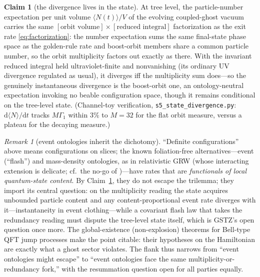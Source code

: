 \documentclass[11pt]{article}
\theoremstyle{definition}
\newtheorem{claim}[theorem]{Claim}
\theoremstyle{remark}
\newtheorem{remark}[theorem]{Remark}
\newcommand{\dd}{\mathrm{d}}
\newcommand{\avg}[1]{\langle #1 \rangle}
\begin{document}
\begin{claim}[the divergence lives in the state]
\label{claim:state}
At tree level, the particle-number expectation per unit volume $\avg{N(t)}/V$ of the
evolving coupled-ghost vacuum carries the same
$[\text{orbit volume}]\times[\text{reduced integral}]$ factorization
as the exit rate \eqref{eq:factorization}: the number expectation
sums the same final-state phase space as the golden-rule rate and
boost-orbit members share a common particle number, so the orbit
multiplicity factors out exactly as there. With the invariant reduced
integral held ultraviolet-finite and nonvanishing (its ordinary UV divergence regulated
as usual), it diverges iff the multiplicity sum does---so the genuinely
instantaneous divergence is the boost-orbit one, an ontology-neutral
expectation invoking no beable configuration space, though it remains
conditional on the tree-level state. (Channel-toy verification,
\texttt{s5\_state\_divergence.py}: $\dd\avg N/\dd t$ tracks
$M\Gamma_1$ within $3\%$ to $M=32$ for the flat orbit measure,
versus a plateau for the decaying measure.)
\end{claim}

\begin{remark}[event ontologies inherit the dichotomy]
\label{rem:flash}
``Definite configurations'' above means configurations on slices;
the known foliation-free alternatives---event (``flash'') and
mass-density ontologies, as in relativistic GRW
\cite{Tumulka2006,Tumulka2020} (whose interacting extension is
delicate; cf.\ the no-go of \cite{JGB2019})---have rates that are
\emph{functionals of local quantum-state content}. By Claim~\ref{claim:state}, they do
not escape the trilemma; they import its central question: on the
multiplicity reading the state acquires unbounded particle content
and any content-proportional event rate diverges with
it---instantaneity in event clothing---while a covariant flash law
that takes the redundancy reading must dispute the tree-level state
itself, which is GSTZ's open question once more. The
global-existence (non-explosion) theorems for Bell-type QFT jump
processes \cite{GeorgiiTumulka} make the point citable: their
hypotheses on the Hamiltonian are exactly what a ghost sector
violates. The flank thus narrows from ``event ontologies might
escape'' to ``event ontologies face the same multiplicity-or-redundancy
fork,'' with the
resummation question open for all parties equally.
\end{remark}

\end{document}
